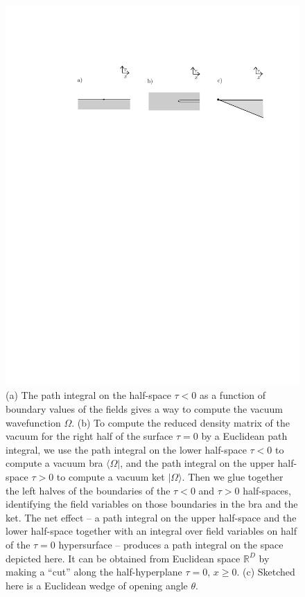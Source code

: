 \documentclass[12pt]{article}
\def\Bbb{\mathbb}
\def\ra{\rangle}
\def\la{\langle}
\def\R{{\Bbb{R}}}\def\Z{{\Bbb{Z}}}
\numberwithin{equation}{section}
\def\Z{{\Bbb Z}}
\begin{document}
\begin{figure}
 \begin{center}
   \includegraphics[width=5.5in]{Fig3.pdf}
 \end{center}
\caption{\small (a) The path integral on the half-space $\tau<0$ as a function of boundary values of the fields
gives a way to compute the vacuum wavefunction $\Omega$.  (b) To compute the reduced
 density matrix of the vacuum for the right half of the surface $\tau=0$ by a Euclidean path integral, we use the path
integral on the lower half-space $\tau<0$ to compute a vacuum bra $\la \Omega|$, and the path integral on the upper half-space
$\tau>0$ to compute a vacuum ket $|\Omega\ra$.  Then we glue together the left halves of the boundaries of the $\tau<0$ and $\tau>0$
half-spaces, identifying the field variables on those boundaries in the bra and the ket.  The net effect -- a path integral on the upper
half-space and the lower half-space together with an integral over field variables on half of the $\tau=0$ hypersurface -- produces
a path integral on the space depicted here.  It can be obtained from Euclidean space $\R^D$ by making a ``cut'' along
the half-hyperplane $\tau=0$, $x\geq 0$.  (c) Sketched here is a Euclidean wedge of opening angle $\theta$.
 \label{Fig3}}
\end{figure}
\end{document}
